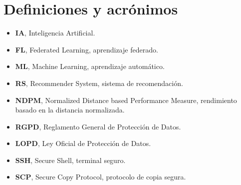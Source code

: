 \chapter{Definiciones y acrónimos}
\thispagestyle{fancy}

\begin{itemize}
    \item \textbf{IA}, Inteligencia Artificial.
    \item \textbf{FL}, Federated Learning, aprendizaje federado.
    \item \textbf{ML}, Machine Learning, aprendizaje automático.
    \item \textbf{RS}, Recommender System, sistema de recomendación.
    \item \textbf{NDPM}, Normalized Distance based Performance Measure, rendimiento basado en la distancia normalizada.
    \item \textbf{RGPD}, Reglamento General de Protección de Datos.
    \item \textbf{LOPD}, Ley Oficial de Protección de Datos.
    \item \textbf{SSH}, Secure Shell, terminal seguro.
    \item \textbf{SCP}, Secure Copy Protocol, protocolo de copia segura.
\end{itemize}
